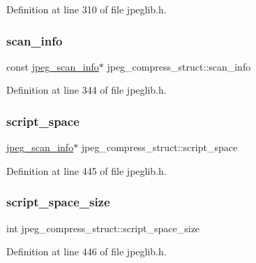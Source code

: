 Definition at line 310 of file jpeglib.\+h.

\mbox{\label{structjpeg__compress__struct_a545fed3fef0d0c5962dbe0e80c067c03}} 
\subsubsection{\texorpdfstring{scan\_info}{scan\_info}}
{\footnotesize\ttfamily const \mbox{\hyperlink{structjpeg__scan__info}{jpeg\+\_\+scan\+\_\+info}}$\ast$ jpeg\+\_\+compress\+\_\+struct\+::scan\+\_\+info}



Definition at line 344 of file jpeglib.\+h.

\mbox{\label{structjpeg__compress__struct_ab4a2c220ed2cda1b0d4c88518d02a229}} 
\subsubsection{\texorpdfstring{script\_space}{script\_space}}
{\footnotesize\ttfamily \mbox{\hyperlink{structjpeg__scan__info}{jpeg\+\_\+scan\+\_\+info}}$\ast$ jpeg\+\_\+compress\+\_\+struct\+::script\+\_\+space}



Definition at line 445 of file jpeglib.\+h.

\mbox{\label{structjpeg__compress__struct_ae50a683b4baddef6571900ca6240b1a3}} 
\subsubsection{\texorpdfstring{script\_space\_size}{script\_space\_size}}
{\footnotesize\ttfamily int jpeg\+\_\+compress\+\_\+struct\+::script\+\_\+space\+\_\+size}



Definition at line 446 of file jpeglib.\+h.

